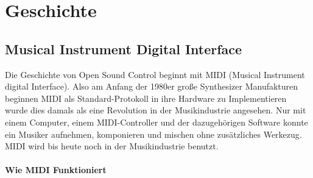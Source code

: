 \documentclass[a4paper, 12pt]{article}
\begin{document}
\maketitle

\newpage
\tableofcontents
\newpage


\section{Geschichte}
\subsection{Musical Instrument Digital Interface}
Die Geschichte von Open Sound Control beginnt mit MIDI (Musical Instrument digital Interface).
Also am Anfang der 1980er große Synthesizer Manufakturen beginnen MIDI als Standard-Protokoll in ihre Hardware zu Implementieren wurde dies damals als eine Revolution in der Musikindustrie angesehen. Nur mit einem Computer, einem MIDI-Controller und der dazugehörigen Software konnte ein Musiker aufnehmen, komponieren und mischen ohne zusätzliches Werkezug. MIDI wird bis heute noch in der Musikindustrie benutzt.
\paragraph{Wie MIDI Funktioniert}
\end{document}
